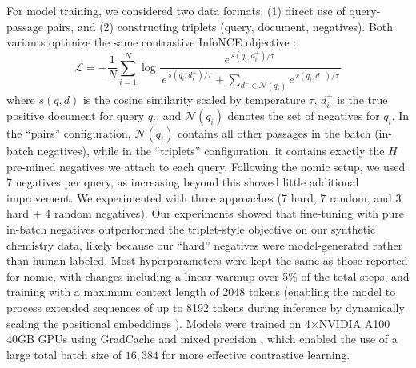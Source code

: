\documentclass[twoside,twocolumn,9pt]{article}
\begin{document}
For model training, we considered two data formats: (1) direct use of query-passage pairs, and (2) constructing triplets (query, document, negatives). Both variants optimize the same contrastive InfoNCE objective \cite{oord2018representation}:
\[
\mathcal{L}
= -\frac{1}{N}\sum_{i=1}^{N}
\log
\frac{e^{\,s(q_i,d_i^+)/\tau\,}}
{\,e^{\,s(q_i,d_i^+)/\tau\,}
  +\displaystyle\sum_{d^-\in\mathcal{N}(q_i)}e^{\,s(q_i,d^-)/\tau\,}
}\!
\]
where \(s(q,d)\) is the cosine similarity scaled by temperature \(\tau\), \(d_i^+\) is the true positive document for query \(q_i\), and \(\mathcal{N}(q_i)\) denotes the set of negatives for \(q_i\). In the “pairs” configuration, \(\mathcal{N}(q_i)\) contains all other passages in the batch (in-batch negatives), while in the “triplets” configuration, it contains exactly the \(H\) pre-mined negatives we attach to each query. Following the nomic setup, we used 7 negatives per query, as increasing beyond this showed little additional improvement. We experimented with three approaches (7 hard, 7 random, and 3 hard + 4 random negatives). Our experiments showed that fine-tuning with pure in-batch negatives outperformed the triplet-style objective on our synthetic chemistry data, likely because our “hard” negatives were model-generated rather than human-labeled. Most hyperparameters were kept the same as those reported for nomic, with changes including a linear warmup over 5\% of the total steps, and training with a maximum context length of 2048 tokens (enabling the model to process extended sequences of up to 8192 tokens during inference by dynamically scaling the positional embeddings \cite{emozilla2023ntk,peng2023yarn}). Models were trained on 4×NVIDIA A100 40GB GPUs using GradCache \cite{gao2021scaling} and mixed precision \cite{micikevicius2017mixed}, which enabled the use of a large total batch size of \textbf{$16,384$} for more effective contrastive learning.
\end{document}
